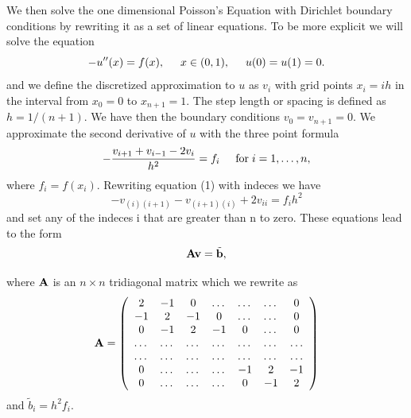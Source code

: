 \documentclass[11pt,a4wide]{article}
\begin{document}
We then solve the one dimensional Poisson's Equation with Dirichlet boundary conditions by rewriting it as a set of linear equations.
To be more explicit we will solve the equation
\[
-u''(x) = f(x), \hspace{0.5cm} x\in(0,1), \hspace{0.5cm} u(0) = u(1) = 0.
\]
and we define the discretized approximation  to $u$ as $v_i$  with 
grid points $x_i=ih$   in the interval from $x_0=0$ to $x_{n+1}=1$.
The step length or spacing is defined as $h=1/(n+1)$. 
We have then the boundary conditions $v_0 = v_{n+1} = 0$.
We  approximate the second derivative of $u$ with the three point formula
\begin{equation}
   -\frac{v_{i+1}+v_{i-1}-2v_i}{h^2} = f_i  \hspace{0.5cm}    
   \mathrm{for} \hspace{0.1cm} i=1,\dots, n, 
\end{equation}
where $f_i=f(x_i)$. Rewriting equation (1) with indeces we have 
\begin{equation}
	-v_{(i)(i+1)}-v_{(i+1)(i)}+2v_{ii}= {f_i}{h^2}
\end{equation}
and set any of the indeces i that are greater than n to zero. These equations lead to the form
\begin{equation}
   {\bf A}{\bf v} = \tilde{{\bf b}},
\end{equation}

where ${\bf A}$ is an $n\times n$  tridiagonal matrix which we rewrite as 
\begin{equation}
    {\bf A} = \left(\begin{array}{ccccccc}
                           2& -1& 0& \dots& \dots&  \dots &0 \\
                           -1 & 2 & -1 &0 &\dots &\dots &0 \\
                           0&-1 &2 & -1 & 0 & \dots &0\\
                           \dots& \dots   & \dots &\dots   &\dots & \dots &\dots\\
                           
						  \dots &\dots &\dots &\dots &\dots &\dots &\dots \\
                           0 &\dots   &\dots  &\dots &-1 &2& -1 \\
                           0 &\dots    &\dots  &\dots & 0  &-1 & 2 \\
                      \end{array} \right)
\end{equation}
and $\tilde{b}_i=h^2f_i$.
\end{document}
